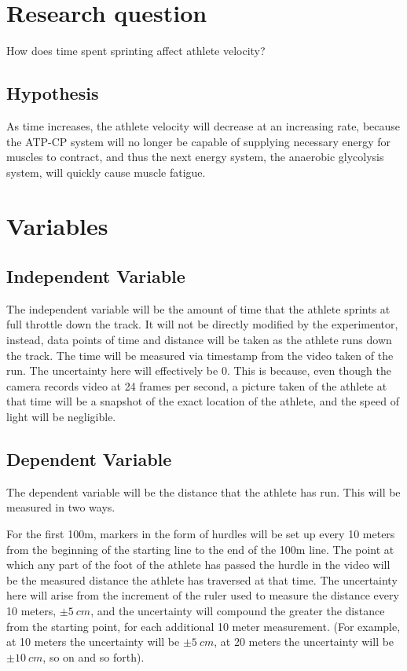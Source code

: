 \documentclass[index]{subfiles}
\begin{document}
\section{Research question}
How does time spent sprinting affect athlete velocity?

\subsection{Hypothesis}
As time increases, the athlete velocity will decrease at an increasing rate, because the ATP-CP system will no longer be capable of supplying necessary energy for muscles to contract, and thus the next energy system, the anaerobic glycolysis system, will quickly cause muscle fatigue.

\section{Variables}

\subsection{Independent Variable}
The independent variable will be the amount of time that the athlete sprints at full throttle down the track. It will not be directly modified by the experimentor, instead, data points of time and distance will be taken as the athlete runs down the track. The time will be measured via timestamp from the video taken of the run. The uncertainty here will effectively be 0. This is because, even though the camera records video at 24 frames per second, a picture taken of the athlete at that time will be a snapshot of the exact location of the athlete, and the speed of light will be negligible.

\subsection{Dependent Variable}
The dependent variable will be the distance that the athlete has run. This will be measured in two ways.

For the first 100m, markers in the form of hurdles will be set up every 10 meters from the beginning of the starting line to the end of the 100m line. The point at which any part of the foot of the athlete has passed the hurdle in the video will be the measured distance the athlete has traversed at that time. The uncertainty here will arise from the increment of the ruler used to measure the distance every 10 meters, \(\pm5\ cm\), and the uncertainty will compound the greater the distance from the starting point, for each additional 10 meter measurement. (For example, at 10 meters the uncertainty will be \(\pm5\ cm\), at 20 meters the uncertainty will be \(\pm10\ cm\), so on and so forth).
\end{document}

